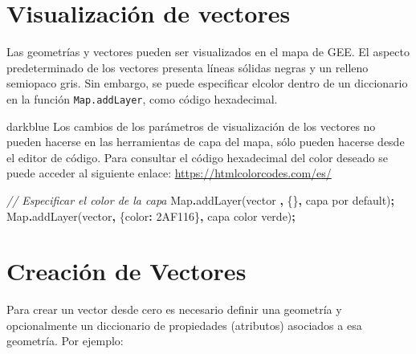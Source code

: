 \documentclass[
  12pt,
  letterpaper,
  twoside]{book}
\newenvironment{Shaded}{\begin{snugshade}}{\end{snugshade}}
\newcommand{\BuiltInTok}[1]{#1}
\newcommand{\CommentTok}[1]{\textcolor[rgb]{0.56,0.35,0.01}{\textit{#1}}}
\newcommand{\DataTypeTok}[1]{\textcolor[rgb]{0.13,0.29,0.53}{#1}}
\newcommand{\FunctionTok}[1]{\textcolor[rgb]{0.00,0.00,0.00}{#1}}
\newcommand{\NormalTok}[1]{#1}
\newcommand{\OperatorTok}[1]{\textcolor[rgb]{0.81,0.36,0.00}{\textbf{#1}}}
\newcommand{\StringTok}[1]{\textcolor[rgb]{0.31,0.60,0.02}{#1}}
\begin{document}
\hypertarget{visualizaciuxf3n-de-vectores}{%
\section{Visualización de vectores}\label{visualizaciuxf3n-de-vectores}}

Las geometrías y vectores pueden ser visualizados en el mapa de GEE. El aspecto predeterminado de los vectores presenta líneas sólidas negras y un relleno semiopaco gris. Sin embargo, se puede especificar elcolor dentro de un diccionario en la función \texttt{Map.addLayer}, como código hexadecimal.

\begin{bluebox2}

\begin{awesomeblock}{5pt}{\faLightbulb}{darkblue}
Los cambios de los parámetros de visualización de los vectores no pueden hacerse en las herramientas de capa del mapa, sólo pueden hacerse desde el editor de código. Para consultar el código hexadecimal del color deseado se puede acceder al siguiente enlace: \url{https://htmlcolorcodes.com/es/}

\end{awesomeblock}

\end{bluebox2}

\begin{Shaded}
\begin{Highlighting}[]
\CommentTok{// Especificar el color de la capa }
\BuiltInTok{Map}\OperatorTok{.}\FunctionTok{addLayer}\NormalTok{(vector }\OperatorTok{,}\NormalTok{ \{\}}\OperatorTok{,} \StringTok{\textquotesingle{}capa por default\textquotesingle{}}\NormalTok{)}\OperatorTok{;}
\BuiltInTok{Map}\OperatorTok{.}\FunctionTok{addLayer}\NormalTok{(vector}\OperatorTok{,}\NormalTok{ \{}\DataTypeTok{color}\OperatorTok{:} \StringTok{\textquotesingle{}2AF116\textquotesingle{}}\NormalTok{\}}\OperatorTok{,} \StringTok{\textquotesingle{}capa color verde\textquotesingle{}}\NormalTok{)}\OperatorTok{;}
\end{Highlighting}
\end{Shaded}

\hypertarget{creaciuxf3n-de-vectores}{%
\section{Creación de Vectores}\label{creaciuxf3n-de-vectores}}

Para crear un vector desde cero es necesario definir una geometría y opcionalmente un diccionario de propiedades (atributos) asociados a esa geometría. Por ejemplo:
\end{document}
